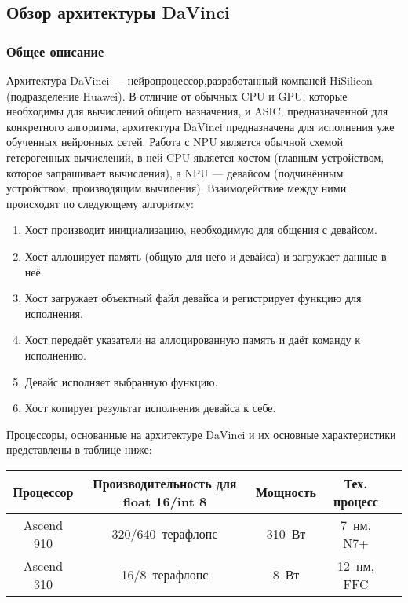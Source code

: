 \subsection{Обзор архитектуры DaVinci}
\subsubsection{Общее описание}

Архитектура DaVinci \cite{ascend} --- нейропроцессор,разработанный компаней HiSilicon
(подразделение Huawei). В отличие от обычных CPU и GPU, которые необходимы
для вычислений общего назначения, и ASIC, предназначенной для конкретного
алгоритма, архитектура DaVinci предназначена для исполнения уже обученных
нейронных сетей. Работа с NPU является обычной схемой гетерогенных вычислений,
в ней CPU является хостом (главным устройством, которое запрашивает вычисления),
а NPU --- девайсом (подчинённым устройством, производящим вычиления).
Взаимодействие между ними происходят по следующему алгоритму:

\begin{enumerate}
    \item Хост производит инициализацию, необходимую для общения с девайсом.
    \item Хост аллоцирует память (общую для него и девайса) и загружает данные в неё.
    \item Хост загружает объектный файл девайса и регистрирует функцию для исполнения.
    \item Хост передаёт указатели на аллоцированную память и даёт команду к исполнению.
    \item Девайс исполняет выбранную функцию.
    \item Хост копирует результат исполнения девайса к себе.
\end{enumerate}

Процессоры, основанные на архитектуре DaVinci и их основные характеристики
представлены в таблице ниже:

\begin{table}[h!]
    \centering
    \begin{tabular}{|c|c|c|c|c|}
        \hline
        Процессор & Производительность для float 16/int 8 & Мощность & Тех. процесс  \\ \hline
        Ascend 910 & 320/640~терафлопс & 310~Вт & 7~нм, N7+ \\ \hline
        Ascend 310 & 16/8~терафлопс & 8~Вт & 12~нм, FFC \\ \hline
    \end{tabular}
\end{table}

